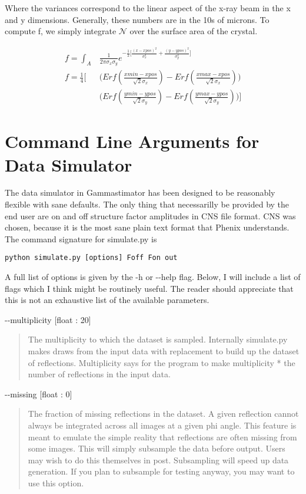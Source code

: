 \documentclass{report}
\begin{document}
Where the variances correspond to the linear aspect of the x-ray beam in the x and y dimensions. Generally, these numbers are in the 10s of microns. 
To compute f, we simply integrate $\mathcal{N}$ over the surface area of the crystal. 

\begin{equation}
\begin{aligned}
f = \int_A &\frac {1} {2\pi \sigma_x \sigma_y} e^{-\frac {1} {2} \big[ \frac {(x - xpos)^2}{\sigma_x^2} + \frac {(y - ypos)^2}{\sigma_y^2} \big]} \\
f = \frac {1} {4} \bigg[ &\bigg( Erf (\frac {xmin - xpos} {\sqrt {2} \sigma_x}) - Erf (\frac {xmax - xpos} {\sqrt {2} \sigma_x} ) \bigg)  \\
 &\bigg( Erf ( \frac {ymin - ypos} {\sqrt {2} \sigma_y}) - Erf (\frac {ymax - ypos} {\sqrt {2} \sigma_y}) \bigg)  \bigg]
\end{aligned}
\end{equation}

\section{Command Line Arguments for Data Simulator}
The data simulator in Gammastimator has been designed to be reasonably flexible with sane defaults. 
The only thing that necessarilly be provided by the end user are on and off structure factor amplitudes in CNS file format.
CNS was chosen, because it is the most sane plain text format that Phenix understands. 
The command signature for simulate.py is

\begin{lstlisting}
python simulate.py [options] Foff Fon out
\end{lstlisting}

A full list of options is given by the -h or -{}-help flag. 
Below, I will include a list of flags which I think might be routinely useful. 
The reader should appreciate that this is not an exhaustive list of the available parameters. 
\bigskip


\noindent
-{}-multiplicity [float : 20] 
\begin{quote}
    The multiplicity to which the dataset is sampled. 
    Internally simulate.py makes draws from the input data with replacement to build up the dataset of reflections. 
    Multiplicity says for the program to make multiplicity * the number of reflections in the input data.
\end{quote}

\noindent
-{}-missing [float : 0] 
\begin{quote}
    The fraction of missing reflections in the dataset. 
    A given reflection cannot always be integrated across all images at a given phi angle.
    This feature is meant to emulate the simple reality that reflections are often missing from some images.
    This will simply subsample the data before output. 
    Users may wish to do this themselves in post.
    Subsampling will speed up data generation.
    If you plan to subsample for testing anyway, you may want to use this option.
\end{quote}
\end{document}

